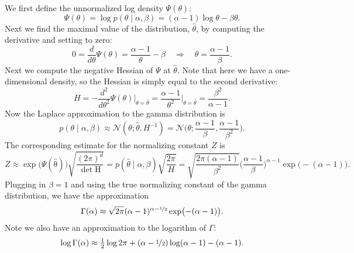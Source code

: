 \documentclass{article}
\newcommand{\given}{\mid}
\newcommand{\mc}[1]{\mathcal{#1}}
\newcommand{\mat}[1]{\bm{\mathrm{#1}}}
\renewcommand{\vec}[1]{\bm{\mathrm{#1}}}
\newcommand{\inv}{^{-1}}
\begin{document}
We first define the unnormalized log density $\Psi(\theta)$:
\begin{equation*}
  \Psi(\theta)
  =
  \log p(\theta \given \alpha, \beta)
  =
  (\alpha - 1) \log \theta - \beta\theta.
\end{equation*}
Next we find the maximal value of the distribution, $\hat{\theta}$, by
computing the derivative and setting to zero:
\begin{equation*}
  0
  =
  \frac{d}{d\theta}
  \Psi(\theta)
  =
  \frac{\alpha - 1}{\theta}
  - \beta
  \quad
  \Rightarrow
  \quad
  \hat{\theta} = \frac{\alpha - 1}{\beta}.
\end{equation*}
Next we compute the negative Hessian of $\Psi$ at $\hat{\theta}$.
Note that here we have a one-dimensional density, so the Hessian is
simply equal to the second derivative:
\begin{equation*}
  H
  =
  -\frac{d^2}{d\theta^2}
  \Psi(\theta)
  \biggr\rvert_{\theta = \hat{\theta}}
  =
  \frac{\alpha - 1}{\theta^2}
  \biggr\rvert_{\theta = \hat{\theta}}
  =
  \frac{\beta^2}{\alpha - 1}.
\end{equation*}
Now the Laplace approximation to the gamma distribution is
\begin{equation*}
  p(\theta \given \alpha, \beta)
  \approx
  \mc{N}(\theta; \hat{\theta}, H\inv)
  =
  \mc{N}\biggl(\theta;
  \frac{\alpha - 1}{\beta},
  \frac{\alpha - 1}{\beta^2}
  \biggr).
\end{equation*}
The corresponding estimate for the normalizing constant $Z$
is
\begin{equation*}
  Z
  \approx
  \exp\bigl(\Psi(\hat{\vec{\theta}})\bigr)
  \sqrt{
    \frac{(2\pi)^d}
         {\det \mat{H}}
  }
  =
  p(\hat{\theta} \given \alpha, \beta)
  \sqrt{\frac{2\pi}{H}}
  =
  \sqrt{\frac{2\pi(\alpha - 1)}{\beta^2}}
  \biggl(\frac{\alpha - 1}{\beta}\biggr)^{\alpha - 1}
  \exp\bigl(-(\alpha - 1)\bigr).
\end{equation*}
Plugging in $\beta = 1$ and using the true normalizing constant of the
gamma distribution, we have the approximation
\begin{equation*}
  \Gamma(\alpha)
  \approx
  \sqrt{2\pi}
  (\alpha - 1)^{\alpha - \nicefrac{1}{2}}
  \exp\bigl(-(\alpha - 1)\bigr).
\end{equation*}
Note we also have an approximation to the logarithm
of $\Gamma$:
\begin{equation*}
  \log \Gamma(\alpha)
  \approx
  \textstyle
  \frac{1}{2}\log 2 \pi
  +
  (\alpha - \nicefrac{1}{2})
  \log(\alpha - 1)
  -
  (\alpha - 1).
\end{equation*}
\end{document}
